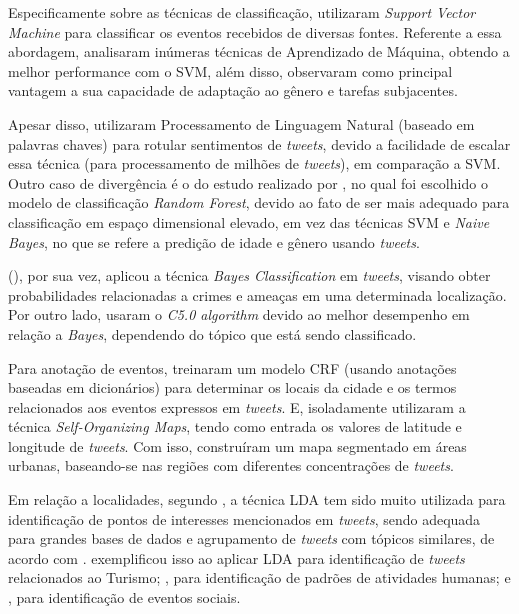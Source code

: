 \documentclass[
	12pt,				%
	oneside,			%
	a4paper,			%
	english,			%
	brazil				%
	]{abntex2ppgsi}
\begin{document}
Especificamente sobre as técnicas de classificação, \cite{Mukherjee2015} utilizaram \textit{Support Vector Machine} para classificar os eventos recebidos de diversas fontes. Referente a essa abordagem, \cite{Gal-Tzur2014} analisaram inúmeras técnicas de Aprendizado de Máquina, obtendo a melhor performance com o SVM, além disso, observaram como principal vantagem a sua capacidade de adaptação ao gênero e tarefas subjacentes. 

Apesar disso, \cite{Guo2016} utilizaram Processamento de Linguagem Natural (baseado em palavras chaves) para rotular sentimentos de \textit{tweets}, devido a facilidade de escalar essa técnica (para processamento de milhões de \textit{tweets}), em comparação a SVM. Outro caso de divergência é o do estudo realizado por \cite{Farseev2015}, no qual foi escolhido o modelo de classificação \textit{Random Forest}, devido ao fato de ser mais adequado para classificação em espaço dimensional elevado, em vez das técnicas SVM e \textit{Naive Bayes}, no que se refere a predição de idade e gênero usando \textit{tweets}.

\citeauthor{Mata2015} (\citeyear{Mata2015}), por sua vez, aplicou a técnica \textit{Bayes Classification} em \textit{tweets}, visando obter probabilidades relacionadas a crimes e ameaças em uma determinada localização. Por outro lado, \cite{Zagal2016} usaram o \textit{C5.0 algorithm} devido ao melhor desempenho em relação a \textit{Bayes}, dependendo do tópico que está sendo classificado. 

Para anotação de eventos, \cite{Anantharam2015} treinaram um modelo CRF (usando anotações baseadas em dicionários) para determinar os locais da cidade e os termos relacionados aos eventos expressos em \textit{tweets}. E, isoladamente \cite{Frias-Martinez2014} utilizaram a técnica \textit{Self-Organizing Maps}, tendo como entrada os valores de latitude e longitude de \textit{tweets}. Com isso, construíram um mapa segmentado em áreas urbanas, baseando-se nas regiões com diferentes concentrações de \textit{tweets}.

Em relação a localidades, segundo \cite{Farseev2015}, a técnica LDA tem sido muito utilizada para identificação de pontos de interesses mencionados em \textit{tweets}, sendo adequada para grandes bases de dados e agrupamento de \textit{tweets} com tópicos similares, de acordo com \cite{Steiger2015Census}. \cite{Abbasi2015} exemplificou isso ao aplicar LDA para identificação de \textit{tweets} relacionados ao Turismo; \cite{Hasan2014}, para identificação de padrões de atividades humanas; e \cite{DiLorenzo2013}, para identificação de eventos sociais.
\end{document}
